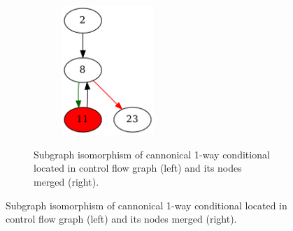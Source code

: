 \documentclass[aspectratio=1610]{beamer}
\begin{document}
\begin{frame}
\begin{figure}[htbp]
\begin{subfigure}[b]{0.65\textwidth}
\begin{subfigure}[ht]{0.40\textwidth}
			\end{subfigure}
			\quad
			\begin{subfigure}[ht]{0.40\textwidth}
				\centering
				\includegraphics[width=0.5\textwidth]{inc/methods/hammock/main_0002b.png}
			\end{subfigure}
			\caption{Subgraph isomorphism of cannonical 1-way conditional located in control flow graph (left) and its nodes merged (right).}
		\end{subfigure}
	\end{figure}
\end{frame}

\end{document}
